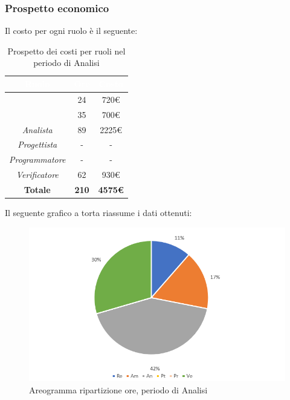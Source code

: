 \subsubsection{Prospetto economico}
Il costo per ogni ruolo è il seguente:
\begin{table}[H]
	\begin{center}
		\begin{tabular}{ |c c c| }
		\rowcolor{darkblue} 
		\textcolor{white}{\textbf{Ruolo}} & \textcolor{white}{\textbf{Ore}} & \textcolor{white}{\textbf{Costo}} \\ \hline
		\textit{\Responsabile} 		& 24 	& 720€ \\ \hline
		\textit{\Amministratore} 	& 35 	& 700€ \\ \hline
		\textit{Analista} 			& 89 	& 2225€ \\ \hline
		\textit{Progettista} 		& - 	& - \\ \hline
		\textit{Programmatore}  	& - 	& - \\ \hline
		\textit{Verificatore} 		& 62 	& 930€ \\ \hline
		\textbf{Totale} 			& \textbf{210} & \textbf{4575€} \\ \hline
		\end{tabular}
	\caption{ Prospetto dei costi per ruoli nel periodo di Analisi}
	\end{center}
\end{table}
Il seguente grafico a torta riassume i dati ottenuti:
\begin{figure}[H]
    \centering
    \includegraphics[scale = 0.75]{Immagini/AnalisiTorta.png}
    \caption{Areogramma ripartizione ore, periodo di Analisi}
    \label{fig:Areogramma ripartizione ore, periodo di Analisi}
\end{figure}
\newpage

